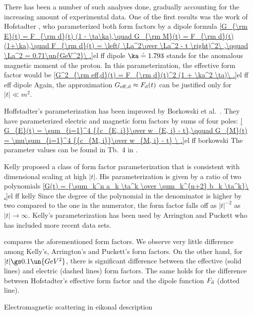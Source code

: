 There has been a number of such analyses done, gradually accounting for the increasing amount of experimental data. One of the first results was the work of Hofstadter , who parameterized both form factors by a dipole formula
\eqref{G_{\rm E}(t) = F_{\rm d}(t) (1 - \ta\ka),\quad G_{\rm M}(t) = F_{\rm d}(t) (1+\ka),\quad F_{\rm d}(t) = \left( \La^2\over \La^2 - t \right)^2\ ,\qquad \La^2 = 0.71\un{GeV^2}\ .}{el ff dipole}
$\ka\doteq 1.793$ stands for the anomalous magnetic moment of the proton. In this parameterization, the effective form factor would be
\eqref{G^2_{\rm eff,d}(t) = F_{\rm d}(t)^2 (1 + \ka^2 \ta)\ .}{el ff eff dipole}
Again, the approximation $G_{\rm eff,d}\approx F_{\rm d}(t)$ can be justified only for $|t| \ll m^2$.

Hoffstadter's parameterization has been improved by Borkowski et al.~. They have parameterized electric and magnetic form factors by sums of four poles:
\eqref{
G_{E}(t) = \sum_{i=1}^4 {{c_{E, i}}\over w_{E, i} - t},\qquad
G_{M}(t) = \mu\sum_{i=1}^4 {{c_{M, i}}\over w_{M, i} - t}
\ .}{el ff borkowski}
The parameter values can be found in Tb.~4 in .

Kelly  proposed a class of form factor parameterization that is consistent with dimensional scaling at high $|t|$. His parameterization is given by a ratio of two polynomials
\eqref{G(t) = {\sum_k^n a_k \ta^k \over \sum_k^{n+2} b_k \ta^k}\ .}{el ff kelly}
Since the degree of the polynomial in the denominator is higher by two compared to the one in the numerator, the form factor falls off as $|t|^{-2}$ as $|t|\to\infty$. Kelly's parameterization has been used by Arrington  and Puckett  who has included more recent data sets.

 compares the aforementioned form factors. We observe very little difference among Kelly's, Arrington's and Puckett's form factors. On the other hand, for $|t| \gs 0.1\un{GeV^2}$, there is significant difference between the effective (solid lines) and electric (dashed lines) form factors. The same holds for the difference between Hofstadter's effective form factor and the dipole function $F_{\rm d}$ (dotted line).


\caption{Electromagnetic scattering in eikonal description}

